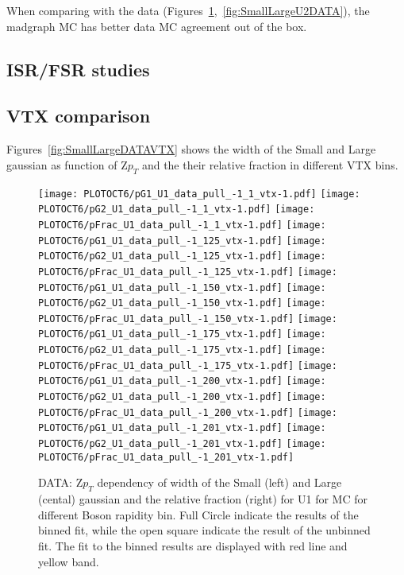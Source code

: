 \documentclass[41pt,a4paper,oneside]{report}
\begin{document}
When comparing with the data (Figures~\ref{fig:SmallLargeU1DATA},~\ref{fig:SmallLargeU2DATA}), the madgraph MC has better data MC agreement out of the box.

\subsection{ISR/FSR studies}
\label{sec:ISR/FSR}

\subsection{VTX comparison}
\label{sec:VTXComp}
Figures~\ref{fig:SmallLargeDATAVTX} shows the width of the Small and Large gaussian as function of Z$p_{T}$ and the their relative fraction in different VTX bins.


\begin{figure}[h!]
  \begin{center}
    \texttt{[image: PLOTOCT6/pG1\_U1\_data\_pull\_-1\_1\_vtx-1.pdf]}
    \texttt{[image: PLOTOCT6/pG2\_U1\_data\_pull\_-1\_1\_vtx-1.pdf]}
    \texttt{[image: PLOTOCT6/pFrac\_U1\_data\_pull\_-1\_1\_vtx-1.pdf]} 
    \texttt{[image: PLOTOCT6/pG1\_U1\_data\_pull\_-1\_125\_vtx-1.pdf]}
    \texttt{[image: PLOTOCT6/pG2\_U1\_data\_pull\_-1\_125\_vtx-1.pdf]}
    \texttt{[image: PLOTOCT6/pFrac\_U1\_data\_pull\_-1\_125\_vtx-1.pdf]} 
    \texttt{[image: PLOTOCT6/pG1\_U1\_data\_pull\_-1\_150\_vtx-1.pdf]}
    \texttt{[image: PLOTOCT6/pG2\_U1\_data\_pull\_-1\_150\_vtx-1.pdf]}
    \texttt{[image: PLOTOCT6/pFrac\_U1\_data\_pull\_-1\_150\_vtx-1.pdf]} 
    \texttt{[image: PLOTOCT6/pG1\_U1\_data\_pull\_-1\_175\_vtx-1.pdf]}
    \texttt{[image: PLOTOCT6/pG2\_U1\_data\_pull\_-1\_175\_vtx-1.pdf]}
    \texttt{[image: PLOTOCT6/pFrac\_U1\_data\_pull\_-1\_175\_vtx-1.pdf]} 
    \texttt{[image: PLOTOCT6/pG1\_U1\_data\_pull\_-1\_200\_vtx-1.pdf]}
    \texttt{[image: PLOTOCT6/pG2\_U1\_data\_pull\_-1\_200\_vtx-1.pdf]}
    \texttt{[image: PLOTOCT6/pFrac\_U1\_data\_pull\_-1\_200\_vtx-1.pdf]} 
    \texttt{[image: PLOTOCT6/pG1\_U1\_data\_pull\_-1\_201\_vtx-1.pdf]}
    \texttt{[image: PLOTOCT6/pG2\_U1\_data\_pull\_-1\_201\_vtx-1.pdf]}
    \texttt{[image: PLOTOCT6/pFrac\_U1\_data\_pull\_-1\_201\_vtx-1.pdf]} 
    \caption{DATA: Z$p_{T}$ dependency of width of the Small (left) and Large (cental) gaussian and the relative fraction (right) for U1 for MC for different Boson rapidity bin. Full Circle indicate the results of the binned fit, while the open square indicate the result of the unbinned fit. The fit to the binned results are displayed with red line and yellow band.
\newline
}
    \label{fig:SmallLargeU1DATA}
  \end{center}
\end{figure}
\end{document}
